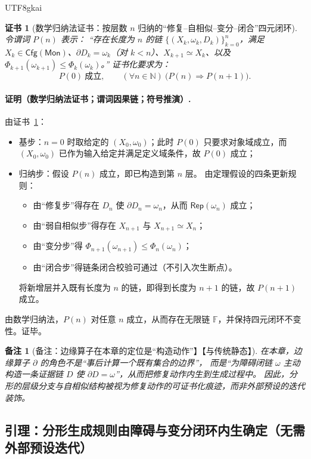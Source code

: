 \documentclass[12pt]{article}
\newtheorem{remark}{备注}[section]
\newtheorem{Certificate}{证书}[section]
\newcommand{\NN}{\mathbb{N}}
\newcommand{\KouJing}{\texorpdfstring{表述约定}{表述约定}}
\begin{document}
\begin{CJK*}{UTF8}{gkai}
\begin{Certificate}[数学归纳法证书：按层数 $n$ 归纳的“修复--自相似--变分--闭合”四元闭环]
\label{cert:tex29-fractal-dynamic-loop}
令谓词 $P(n)$ 表示：
“存在长度为 $n$ 的链 $\{(X_k,\omega_k,D_k)\}_{k=0}^{n}$，满足
$X_k\in\mathsf{Cfg}(\mathsf{Mon})$、$\partial D_k=\omega_k$（对 $k<n$）、$X_{k+1}\simeq X_k$、以及
$\Phi_{k+1}(\omega_{k+1})\le \Phi_k(\omega_k)$。”
证书化要求为：
\[
  P(0)\ \text{成立},\qquad (\forall n\in\NN)\ \bigl(P(n)\Rightarrow P(n+1)\bigr).
\]
\end{Certificate}

\paragraph{证明（数学归纳法证书；谓词因果链；符号推演）.}
由证书~\ref{cert:tex29-fractal-dynamic-loop}：
\begin{itemize}
  \item 基步：$n=0$ 时取给定的 $(X_0,\omega_0)$；此时 $P(0)$ 只要求对象域成立，而 $(X_0,\omega_0)$ 已作为输入给定并满足定义域条件，故 $P(0)$ 成立；
  \item 归纳步：假设 $P(n)$ 成立，即已构造到第 $n$ 层。
  由定理假设的四条更新规则：
  \begin{itemize}
    \item 由“修复步”得存在 $D_n$ 使 $\partial D_n=\omega_n$，从而 $\mathsf{Rep}(\omega_n)$ 成立；
    \item 由“弱自相似步”得存在 $X_{n+1}$ 与 $X_{n+1}\simeq X_n$；
    \item 由“变分步”得 $\Phi_{n+1}(\omega_{n+1})\le \Phi_n(\omega_n)$；
    \item 由“闭合步”得链条闭合校验可通过（不引入次生断点）。
  \end{itemize}
  将新增层并入既有长度为 $n$ 的链，即得到长度为 $n+1$ 的链，故 $P(n+1)$ 成立。
\end{itemize}
由数学归纳法，$P(n)$ 对任意 $n$ 成立，从而存在无限链 $\mathbb{F}$，并保持四元闭环不变性。证毕。

\begin{remark}[备注：边缘算子在本章的定位是“构造动作”】【与传统静态】]
在本章，边缘算子 $\partial$ 的角色不是“事后计算一个既有集合的边界”，
而是“为障碍闭链 $\omega$ 主动构造一条证据链 $D$ 使 $\partial D=\omega$”，从而把修复动作内生到生成过程中。
因此，分形的层级分支与自相似结构被视为修复动作的可证书化痕迹，而非外部预设的迭代装饰。
\end{remark}

\subsection{引理：分形生成规则由障碍与变分闭环内生确定（无需外部预设迭代）}
\label{subsec:tex29-fractal-no-external-iteration}


\end{CJK*}
\end{document}
